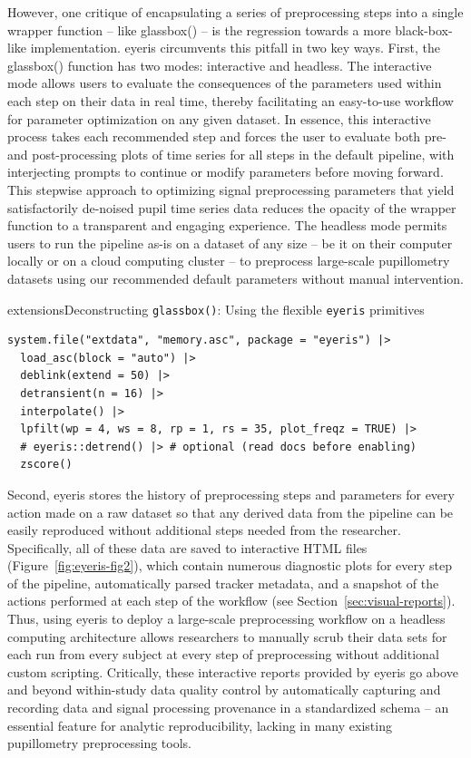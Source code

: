 However, one critique of encapsulating a series of preprocessing steps into a single wrapper function – like glassbox() – is the regression towards a more black-box-like implementation. eyeris circumvents this pitfall in two key ways. First, the glassbox() function has two modes: interactive and headless. The interactive mode allows users to evaluate the consequences of the parameters used within each step on their data in real time, thereby facilitating an easy-to-use workflow for parameter optimization on any given dataset. In essence, this interactive process takes each recommended step and forces the user to evaluate both pre- and post-processing plots of time series for all steps in the default pipeline, with interjecting prompts to continue or modify parameters before moving forward. This stepwise approach to optimizing signal preprocessing parameters that yield satisfactorily de-noised pupil time series data reduces the opacity of the wrapper function to a transparent and engaging experience. The headless mode permits users to run the pipeline as-is on a dataset of any size – be it on their computer locally or on a cloud computing cluster – to preprocess large-scale pupillometry datasets using our recommended default parameters without manual intervention.

\begin{eyerisbox}{extensions}{Deconstructing \texttt{glassbox()}: Using the flexible \texttt{eyeris} primitives}
\begin{lstlisting}
system.file("extdata", "memory.asc", package = "eyeris") |>
  load_asc(block = "auto") |>
  deblink(extend = 50) |>
  detransient(n = 16) |>
  interpolate() |>
  lpfilt(wp = 4, ws = 8, rp = 1, rs = 35, plot_freqz = TRUE) |>
  # eyeris::detrend() |> # optional (read docs before enabling)
  zscore()
\end{lstlisting}
\end{eyerisbox}

Second, eyeris stores the history of preprocessing steps and parameters for every action made on a raw dataset so that any derived data from the pipeline can be easily reproduced without additional steps needed from the researcher. Specifically, all of these data are saved to interactive HTML files (Figure~\ref{fig:eyeris-fig2}), which contain numerous diagnostic plots for every step of the pipeline, automatically parsed tracker metadata, and a snapshot of the actions performed at each step of the workflow (see Section~\ref{sec:visual-reports}). Thus, using eyeris to deploy a large-scale preprocessing workflow on a headless computing architecture allows researchers to manually scrub their data sets for each run from every subject at every step of preprocessing without additional custom scripting. Critically, these interactive reports provided by eyeris go above and beyond within-study data quality control by automatically capturing and recording data and signal processing provenance in a standardized schema \parencite{mackenziegraham2008provenance} – an essential feature for analytic reproducibility, lacking in many existing pupillometry preprocessing tools.

